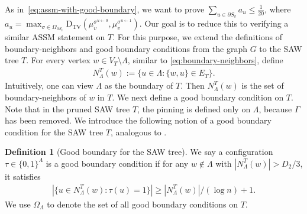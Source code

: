 \documentclass[11pt]{amsart}
\def\-#1{\mathrm{#1}}
\newcommand{\defeq}{:=}
\newcommand{\DTV}[2]{\-D_{\mathrm{TV}}\left({#1},{#2}\right)}
\newcommand{\nbd}[2]{N_{#1}^{#2}}
\theoremstyle{definition}
\newtheorem{definition}[theorem]{Definition}
\theoremstyle{remark}
\begin{document}


As in~\eqref{eq:assm-with-good-boundary}, we want to prove $\sum_{u\in \partial S_v}a_u\leq \frac{1}{20}$, where $a_u = \max_{\sigma \in \Omega_{\partial S_v}} \DTV{\mu^{\sigma^{u \gets 0}}_v}{\mu^{\sigma^{u \gets 1}}_v}$.
Our goal is to reduce this to verifying a similar ASSM statement on $T$.
For this purpose, we extend the definitions of boundary-neighbors and good boundary conditions from the graph $G$ to the SAW tree $T$.
For every vertex $w \in V_T \setminus \Lambda$, similar to \eqref{eq:boundary-neighbors}, define 
\begin{align*}
    \nbd{\Lambda}{T}(w) \defeq \{u \in \Lambda: \{w,u\} \in E_T\}.
\end{align*}
Intuitively, one can view $\Lambda$ as the boundary of $T$. Then $\nbd{\Lambda}{T}(w)$ is the set of boundary-neighbors of $w$ in $T$.
We next define a good boundary condition on $T$.
Note that in the pruned SAW tree $T$, the pinning is defined only on  $\Lambda$, because $\Gamma$ has been removed.
We introduce the following notion of a good boundary condition for the SAW tree $T$, analogous to .  

\begin{definition}[Good boundary for the SAW tree]\label{def:good-boundary-configuration-for-saw-tree}
We say a configuration $\tau \in \{0,1\}^{\Lambda}$ is a good boundary condition if for any $w \notin \Lambda$ with $|\nbd{\Lambda}{T}(w)|>D_2/3$, it satisfies
\begin{align}\label{eq:good-boundary-configuration-for-saw-tree}
    |\{u\in \nbd{\Lambda}{T}(w): \tau(u) = 1\}|\geq |\nbd{\Lambda}{T}(w)|/(\log n) + 1.
\end{align}
We use $\Omega_{\Lambda}$ to denote the set of all good boundary conditions on $T$.
\end{definition}
\end{document}
